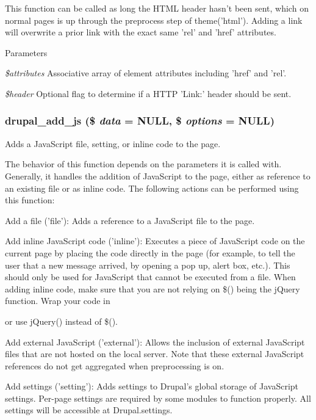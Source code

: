 This function can be called as long the HTML header hasn't been sent, which on normal pages is up through the preprocess step of theme('html'). Adding a link will overwrite a prior link with the exact same 'rel' and 'href' attributes.


\begin{DoxyParams}{Parameters}
\item[{\em \$attributes}]Associative array of element attributes including 'href' and 'rel'. \item[{\em \$header}]Optional flag to determine if a HTTP 'Link:' header should be sent. \end{DoxyParams}
\hypertarget{common_8inc_a623370a2c3c2de0390dab078d17dca02}{
\subsubsection[{drupal\_\-add\_\-js}]{\setlength{\rightskip}{0pt plus 5cm}drupal\_\-add\_\-js (\$ {\em data} = {\ttfamily NULL}, \/  \$ {\em options} = {\ttfamily NULL})}}
\label{common_8inc_a623370a2c3c2de0390dab078d17dca02}
Adds a JavaScript file, setting, or inline code to the page.

The behavior of this function depends on the parameters it is called with. Generally, it handles the addition of JavaScript to the page, either as reference to an existing file or as inline code. The following actions can be performed using this function:
\begin{DoxyItemize}
\item Add a file ('file'): Adds a reference to a JavaScript file to the page.
\item Add inline JavaScript code ('inline'): Executes a piece of JavaScript code on the current page by placing the code directly in the page (for example, to tell the user that a new message arrived, by opening a pop up, alert box, etc.). This should only be used for JavaScript that cannot be executed from a file. When adding inline code, make sure that you are not relying on \$() being the jQuery function. Wrap your code in 
 or use jQuery() instead of \$().
\item Add external JavaScript ('external'): Allows the inclusion of external JavaScript files that are not hosted on the local server. Note that these external JavaScript references do not get aggregated when preprocessing is on.
\item Add settings ('setting'): Adds settings to Drupal's global storage of JavaScript settings. Per-\/page settings are required by some modules to function properly. All settings will be accessible at Drupal.settings.
\end{DoxyItemize}

